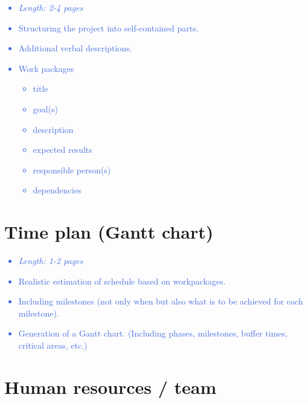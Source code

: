 \documentclass[a4paper,11pt]{article}
\providecommand*{\note}[1]{\small \textcolor{RoyalBlue}{\begin{minipage}{\textwidth}{#1}\end{minipage}}}
\begin{document}
\note{
\begin{itemize}
\item {\em Length: 2-4 pages}
\item Structuring the project into self-contained parts.
\item Additional verbal descriptions.
\item Work packages
    \begin{itemize}
    \item title
    \item goal(s)
    \item description
    \item expected results
    \item responsible person(s)
    \item dependencies
    \end{itemize}
\end{itemize}
}

\section{Time plan (Gantt chart)}
\label{sect:timeplan}

\note{
\begin{itemize}
\item {\em Length: 1-2 pages}
\item Realistic estimation of schedule based on workpackages.
\item Including milestones (not only when but also what is to be achieved for each milestone).
\item Generation of a Gantt chart. (Including phases, milestones, buffer times, critical areas, etc.)
\end{itemize}
}

\section{Human resources / team}
\label{sect:team}
\end{document}
